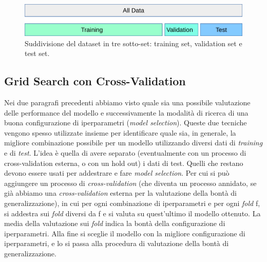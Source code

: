 \documentclass[12pt,italian]{report}
\begin{document}


\begin{figure}[h!]
	\center
	\includegraphics[scale=0.5]{../img/train_test_validation} %
	\caption{Suddivisione del dataset in tre sotto-set: training set, validation set e test set. }
	\label{fig:train_test_validation}
\end{figure}

\subsection{Grid Search con Cross-Validation}
\label{sec:gridsearchcv}
Nei due paragrafi precedenti abbiamo visto quale sia una possibile valutazione delle performance del modello e successivamente la modalità di ricerca di una buona configurazione di iperparametri (\emph{model selection}). Queste due tecniche vengono spesso utilizzate insieme per identificare quale sia, in generale, la migliore combinazione possibile per un modello utilizzando diversi dati di \emph{training} e di \emph{test}.
L'idea è quella di avere separato (eventualmente con un processo di cross-validation esterna, o con un hold out) i dati di test. Quelli che restano devono essere usati per addestrare e fare \emph{model selection}. Per cui si può aggiungere un processo di \emph{cross-validation} (che diventa un processo annidato, se già abbiamo una \emph{cross-validation} esterna per la valutazione della bontà di generalizzazione), in cui per ogni combinazione di iperparametri e per ogni \emph{fold} f, si addestra sui \emph{fold} diversi da f e si valuta su quest'ultimo il modello ottenuto. La media della valutazione sui \emph{fold} indica la bontà della configurazione di iperparametri. Alla fine si sceglie il modello con la migliore configurazione di iperparametri, e lo si passa alla procedura di valutazione della bontà di generalizzazione.
\end{document}
